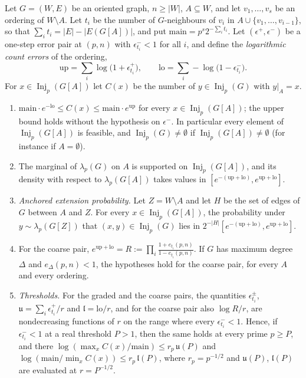\begin{lemma}\label{lem:graphs:sequential}
Let $G=(W,E)$ be an oriented graph, $n\ge|W|$, $A\subseteq W$, and let
$v_1,\dots,v_s$ be an ordering of $W\setminus A$. Let $t_i$ be the number of
$G$-neighbours of $v_i$ in $A\cup\{v_1,\dots,v_{i-1}\}$, so that
$\sum_it_i=|E|-|E(G[A])|$, and put $\mathrm{main}=p^s2^{-\sum_it_i}$. Let
$(\epsilon^+,\epsilon^-)$ be a one-step error pair at $(p,n)$ with
$\epsilon^-_{t_i}<1$ for all $i$, and define the \emph{logarithmic count errors}
of the ordering,
\[
 \mathrm{up}=\sum_i\log\bigl(1+\epsilon^+_{t_i}\bigr),\qquad
 \mathrm{lo}=\sum_i-\log\bigl(1-\epsilon^-_{t_i}\bigr).
\]
For $x\in\operatorname{Inj}_p(G[A])$ let $C(x)$ be the number of
$y\in\operatorname{Inj}_p(G)$ with $y|_A=x$.
\begin{enumerate}[label=\textup{(\alph*)}]
\item\label{it:seq:count} $\mathrm{main}\cdot e^{-\mathrm{lo}}\le C(x)\le\mathrm{main}\cdot e^{\mathrm{up}}$
 for every $x\in\operatorname{Inj}_p(G[A])$; the upper bound holds without the
 hypothesis on $\epsilon^-$. In particular every element of
 $\operatorname{Inj}_p(G[A])$ is feasible, and $\operatorname{Inj}_p(G)\ne\emptyset$
 if $\operatorname{Inj}_p(G[A])\ne\emptyset$ (for instance if $A=\emptyset$).
\item\label{it:seq:marg} The marginal of $\lambda_p(G)$ on $A$ is supported on
 $\operatorname{Inj}_p(G[A])$, and its density with respect to $\lambda_p(G[A])$
 takes values in $[e^{-(\mathrm{up}+\mathrm{lo})},e^{\mathrm{up}+\mathrm{lo}}]$.
\item\label{it:seq:rows} \emph{Anchored extension probability.} Let $Z=W\setminus A$ and let $H$ be the
 set of edges of $G$ between $A$ and $Z$. For every $x\in\operatorname{Inj}_p(G[A])$,
 the probability under $y\sim\lambda_p(G[Z])$ that $(x,y)\in\operatorname{Inj}_p(G)$
 lies in $2^{-|H|}[e^{-(\mathrm{up}+\mathrm{lo})},e^{\mathrm{up}+\mathrm{lo}}]$.
\item\label{it:seq:coarse} For the coarse pair,
 $e^{\mathrm{up}+\mathrm{lo}}=R:=\prod_i\frac{1+e_{t_i}(p,n)}{1-e_{t_i}(p,n)}$. If
 $G$ has maximum degree $\Delta$ and $e_\Delta(p,n)<1$, the hypotheses hold for
 the coarse pair, for every $A$ and every ordering.
\item\label{it:seq:thresholds} \emph{Thresholds.} For the graded and the coarse
 pairs, the quantities $\epsilon^\pm_{t_i}$, $\mathfrak u=\sum_i\epsilon^+_{t_i}/r$
 and $\mathfrak l=\mathrm{lo}/r$, and for the coarse pair also $\log R/r$, are
 nondecreasing functions of $r$ on the range where every $\epsilon^-_{t_i}<1$.
 Hence, if $\epsilon^-_{t_i}<1$ at a real threshold $P>1$, then the same holds at
 every prime $p\ge P$, and there
 $\log(\max_xC(x)/\mathrm{main})\le r_p\,\mathfrak u(P)$ and
 $\log(\mathrm{main}/\min_xC(x))\le r_p\,\mathfrak l(P)$, where $r_p=p^{-1/2}$ and
 $\mathfrak u(P)$, $\mathfrak l(P)$ are evaluated at $r=P^{-1/2}$.
\end{enumerate}
\end{lemma}

